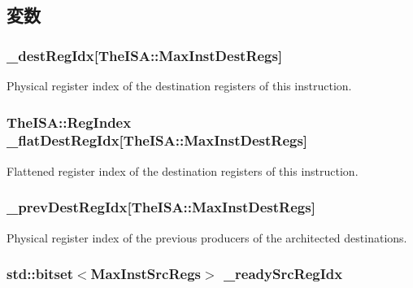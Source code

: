 \subsection{変数}
\hypertarget{classBaseDynInst_a1536987a8d6f8490fc850b9cc95a9eb9}{
\subsubsection[{\_\-destRegIdx}]{ {\bf \_\-destRegIdx}\mbox{[}TheISA::MaxInstDestRegs\mbox{]}}}
\label{classBaseDynInst_a1536987a8d6f8490fc850b9cc95a9eb9}
Physical register index of the destination registers of this instruction. \hypertarget{classBaseDynInst_a44085d1f8566ca30fef0c6787999c79b}{
\subsubsection[{\_\-flatDestRegIdx}]{\setlength{\rightskip}{0pt plus 5cm}TheISA::RegIndex {\bf \_\-flatDestRegIdx}\mbox{[}TheISA::MaxInstDestRegs\mbox{]}}}
\label{classBaseDynInst_a44085d1f8566ca30fef0c6787999c79b}
Flattened register index of the destination registers of this instruction. \hypertarget{classBaseDynInst_a32bf6cb0ac0bfb27a8b60945ca3c3603}{
\subsubsection[{\_\-prevDestRegIdx}]{ {\bf \_\-prevDestRegIdx}\mbox{[}TheISA::MaxInstDestRegs\mbox{]}}}
\label{classBaseDynInst_a32bf6cb0ac0bfb27a8b60945ca3c3603}
Physical register index of the previous producers of the architected destinations. \hypertarget{classBaseDynInst_a78a797b8c24ad873d0cbe5f52487b02f}{
\subsubsection[{\_\-readySrcRegIdx}]{\setlength{\rightskip}{0pt plus 5cm}std::bitset$<$MaxInstSrcRegs$>$ {\bf \_\-readySrcRegIdx}}}
